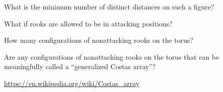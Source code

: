 \documentclass{article}
\begin{document}
\begin{question}
  What is the minimum number of distinct distances on such a figure?
\end{question}
\begin{related}
  \item What if rooks are allowed to be in attacking positions?
  \item How many configurations of nonattacking rooks on the torus?
  \item Are any configurations of nonattacking rooks on the torus that can
    be meaningfully called a ``generalized Costas array''?
\end{related}
\begin{references}
  \item \url{https://en.wikipedia.org/wiki/Costas_array}
\end{references}
\end{document}
